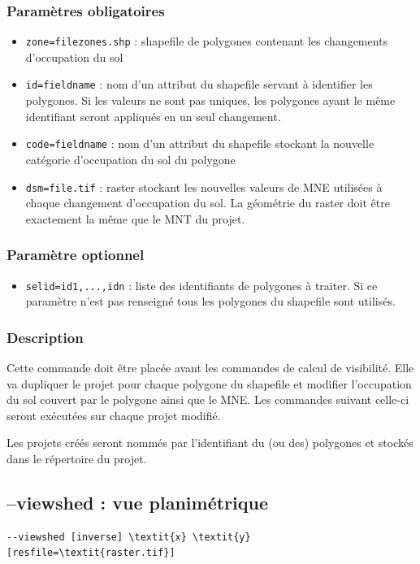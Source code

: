 \documentclass{report}
\begin{document}
\subsubsection{Paramètres obligatoires}
\begin{itemize}
	\item \verb|zone=filezones.shp| : shapefile de polygones contenant les changements d'occupation du sol
	\item \verb|id=fieldname| : nom d'un attribut du shapefile servant à identifier les polygones. Si les valeurs ne sont pas uniques, les polygones ayant le même identifiant seront appliqués en un seul changement.
	\item \verb|code=fieldname| : nom d'un attribut du shapefile stockant la nouvelle catégorie d'occupation du sol du polygone
	\item \verb|dsm=file.tif| : raster stockant les nouvelles valeurs de MNE utilisées à chaque changement d'occupation du sol. La géométrie du raster doit être exactement la même que le MNT du projet.
\end{itemize}

\subsubsection{Paramètre optionnel}
\begin{itemize}
	\item \verb|selid=id1,...,idn| : liste des identifiants de polygones à traiter. Si ce paramètre n'est pas renseigné tous les polygones du shapefile sont utilisés.
\end{itemize}

\subsubsection{Description}
Cette commande doit être placée avant les commandes de calcul de visibilité. Elle va dupliquer le projet pour chaque polygone du shapefile et modifier l'occupation du sol couvert par le polygone ainsi que le MNE. Les commandes suivant celle-ci seront exécutées sur chaque projet modifié.

Les projets créés seront nommés par l'identifiant du (ou des) polygones et stockés dans le répertoire du projet.

\subsection{--viewshed : vue planimétrique}
\begin{Verbatim}[commandchars=\\\{\}]
--viewshed [inverse] \textit{x} \textit{y} [resfile=\textit{raster.tif}]
\end{Verbatim}
\end{document}
